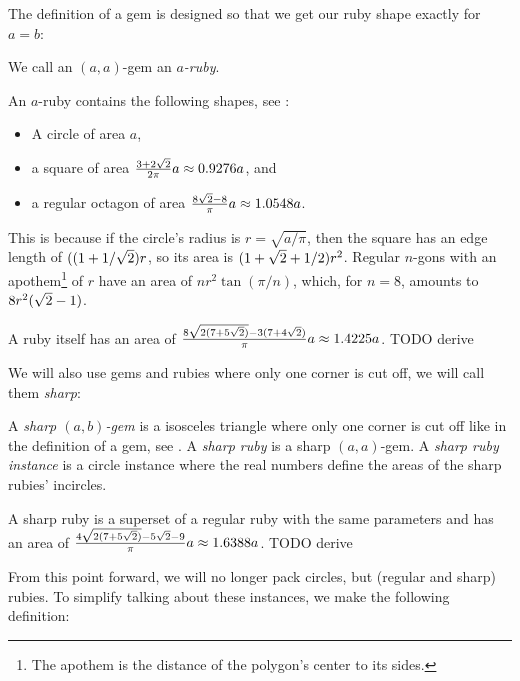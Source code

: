 \documentclass[a4paper,style=print,oneside,bibliography=totoc,nexus,lnum,extramargin]{tubsbook}
\begin{document}

The definition of a gem is designed so that we get our ruby shape exactly for $a = b$:

\begin{definition}
    We call an $(a,a)$-gem an \emph{$a$-ruby}.
\end{definition}

An $a$-ruby contains the following shapes, see :

\begin{itemize}
    \item A circle of area $a$,
    \item a square of area $\frac{3+2\sqrt{2}}{2\pi}a \approx 0.9276a$, and
    \item a regular octagon of area $\frac{8\sqrt{2}-8}{\pi}a \approx 1.0548a$.
\end{itemize}

This is because if the circle's radius is $r = \sqrt{a/\pi}$, then the square has an edge length of $((1+1/\sqrt{2})r$, so its area is $(1+\sqrt{2}+1/2)r^2$. Regular $n$-gons with an apothem\footnote{The apothem is the distance of the polygon's center to its sides.} of $r$ have an area of $nr^2\tan(\pi/n)$, which, for $n=8$, amounts to $8r^2(\sqrt{2}-1)$.


A ruby itself has an area of $\frac{8\sqrt{2(7+5\sqrt{2})}-3(7+4\sqrt{2})}{\pi}a \approx 1.4225a$. TODO derive

We will also use gems and rubies where only one corner is cut off, we will call them \emph{sharp}:

\begin{definition}
    A \emph{sharp $(a,b)$-gem} is a isosceles triangle where only one corner is cut off like in the definition of a gem, see . A \emph{sharp ruby} is a sharp $(a,a)$-gem. A \emph{sharp ruby instance} is a circle instance where the real numbers define the areas of the sharp rubies' incircles.
\end{definition}


A sharp ruby is a superset of a regular ruby with the same parameters and has an area of $\frac{4\sqrt{2(7+5\sqrt{2})}-5\sqrt{2}-9}{\pi}a \approx 1.6388a$. TODO derive

From this point forward, we will no longer pack circles, but (regular and sharp) rubies. To simplify talking about these instances, we make the following definition:
\end{document}
